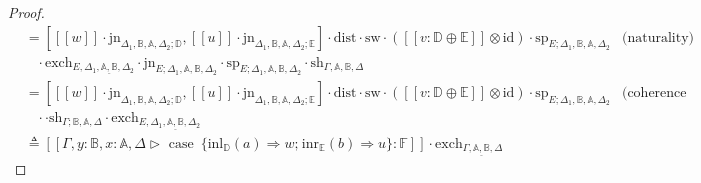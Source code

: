 \documentclass[10pt,a4paper]{amsart}
\theoremstyle{definition}
\theoremstyle{definition}
\theoremstyle{definition}
\theoremstyle{definition}
\theoremstyle{definition}
\theoremstyle{definition}
\begin{document}
\begin{proof}
\begin{align*}
  & = [[\![ w ]\!] \cdot \text{jn}_{\Delta_{1} ,\mathbb{B},\mathbb{A},  \Delta_{2};\mathbb{D}},  [\![u ]\!] \cdot \text{jn}_{\Delta_{1} ,\mathbb{B},\mathbb{A},  \Delta_{2};\mathbb{E}}] \cdot \text{dist} \cdot \text{sw} \cdot ([\![  v : \mathbb{D} \oplus \mathbb{E}  ]\!] \otimes \text{id}) \cdot \text{sp}_{E;\Delta_{1}, \mathbb{B}, \mathbb{A}, \Delta_{2}} & {\text{(naturality)}} \\
  & \hspace{10pt}  \cdot  \text{exch}_{E, \Delta_{1},\underline{\mathbb{A},\mathbb{B}},  \Delta_{2}} \cdot  \text{jn}_{E ;\Delta_{1},\mathbb{A},\mathbb{B},  \Delta_{2}}   \cdot\text{sp}_{E; \Delta_{1},\mathbb{A},\mathbb{B},  \Delta_{2}} \cdot \text{sh}_{\Gamma,\mathbb{A}, \mathbb{B},\Delta} \\
  & = [[\![ w ]\!] \cdot \text{jn}_{\Delta_{1} ,\mathbb{B},\mathbb{A},  \Delta_{2};\mathbb{D}},  [\![u ]\!] \cdot \text{jn}_{\Delta_{1} ,\mathbb{B},\mathbb{A},  \Delta_{2};\mathbb{E}}] \cdot \text{dist} \cdot \text{sw} \cdot ([\![  v : \mathbb{D} \oplus \mathbb{E}  ]\!] \otimes \text{id}) \cdot \text{sp}_{E; \Delta_{1}, \mathbb{B},\mathbb{A},  \Delta_{2}} & {\text{(coherence theorem)}} \\
  & \hspace{10pt} \cdot \cdot \text{sh}_{\Gamma; \mathbb{B},\mathbb{A}, \Delta} \cdot  \text{exch}_{E, \Delta_{1},\underline{\mathbb{A},\mathbb{B}},  \Delta_{2}} \\
  & \triangleq [\![\Gamma,y:\mathbb{B}, x:\mathbb{A}, \Delta \triangleright \text{ case }  \hspace{2pt}  \{\text{inl}_{\mathbb{D}} (a) \Rightarrow w ; \hspace{1pt} \text{inr}_{\mathbb{E}} (b) \Rightarrow u\}: \mathbb{F}]\!] \cdot \text{exch}_{\Gamma,\underline{\mathbb{A},  \mathbb{B}}, \Delta}
\end{align*}



\end{proof}


 

\end{document}
